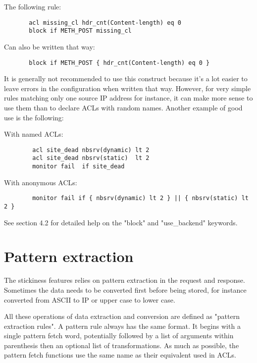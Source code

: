    The following rule:

\begin{verbatim}
       acl missing_cl hdr_cnt(Content-length) eq 0
       block if METH_POST missing_cl
\end{verbatim}

   Can also be written that way:

\begin{verbatim}
       block if METH_POST { hdr_cnt(Content-length) eq 0 }
\end{verbatim}

It is generally not recommended to use this construct because it's a lot easier
to leave errors in the configuration when written that way. However, for very
simple rules matching only one source IP address for instance, it can make more
sense to use them than to declare ACLs with random names. Another example of
good use is the following:

   With named ACLs:
   
   \begin{verbatim}
        acl site_dead nbsrv(dynamic) lt 2
        acl site_dead nbsrv(static)  lt 2
        monitor fail  if site_dead
   \end{verbatim}

   With anonymous ACLs:

   \begin{verbatim}
        monitor fail if { nbsrv(dynamic) lt 2 } || { nbsrv(static) lt 2 }
   \end{verbatim}

See section 4.2 for detailed help on the "block" and "use\_backend" keywords.

\section{Pattern extraction}

The stickiness features relies on pattern extraction in the request and
response. Sometimes the data needs to be converted first before being stored,
for instance converted from ASCII to IP or upper case to lower case.

All these operations of data extraction and conversion are defined as
"pattern extraction rules". A pattern rule always has the same format. It
begins with a single pattern fetch word, potentially followed by a list of
arguments within parenthesis then an optional list of transformations. As
much as possible, the pattern fetch functions use the same name as their
equivalent used in ACLs.

